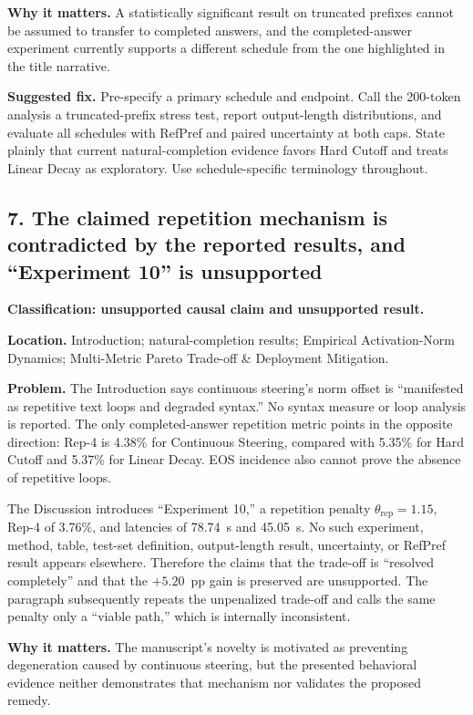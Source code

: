 \documentclass[11pt]{article}
\begin{document}
\textbf{Why it matters.} A statistically significant result on truncated prefixes cannot be assumed to transfer to completed answers, and the completed-answer experiment currently supports a different schedule from the one highlighted in the title narrative.

\textbf{Suggested fix.} Pre-specify a primary schedule and endpoint.  Call the 200-token analysis a truncated-prefix stress test, report output-length distributions, and evaluate all schedules with RefPref and paired uncertainty at both caps.  State plainly that current natural-completion evidence favors Hard Cutoff and treats Linear Decay as exploratory.  Use schedule-specific terminology throughout.

\subsection*{7. The claimed repetition mechanism is contradicted by the reported results, and ``Experiment 10'' is unsupported}

\textbf{Classification: unsupported causal claim and unsupported result.}

\textbf{Location.} Introduction; natural-completion results; Empirical Activation-Norm Dynamics; Multi-Metric Pareto Trade-off \& Deployment Mitigation.

\textbf{Problem.} The Introduction says continuous steering's norm offset is ``manifested as repetitive text loops and degraded syntax.''  No syntax measure or loop analysis is reported.  The only completed-answer repetition metric points in the opposite direction: Rep-4 is 4.38\% for Continuous Steering, compared with 5.35\% for Hard Cutoff and 5.37\% for Linear Decay.  EOS incidence also cannot prove the absence of repetitive loops.

The Discussion introduces ``Experiment 10,'' a repetition penalty $\theta_{\text{rep}}=1.15$, Rep-4 of 3.76\%, and latencies of 78.74~s and 45.05~s.  No such experiment, method, table, test-set definition, output-length result, uncertainty, or RefPref result appears elsewhere.  Therefore the claims that the trade-off is ``resolved completely'' and that the $+5.20$~pp gain is preserved are unsupported.  The paragraph subsequently repeats the unpenalized trade-off and calls the same penalty only a ``viable path,'' which is internally inconsistent.

\textbf{Why it matters.} The manuscript's novelty is motivated as preventing degeneration caused by continuous steering, but the presented behavioral evidence neither demonstrates that mechanism nor validates the proposed remedy.
\end{document}
